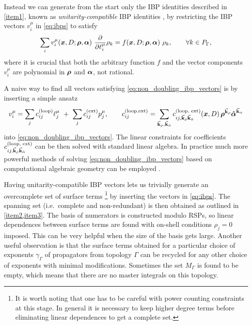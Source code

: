 Instead we can generate from the start only the IBP identities described in \cref{item1},
known as \emph{unitarity-compatible} IBP identities \cite{Gluza:2010ws,Schabinger:2011dz,Ita:2015tya}, by
restricting the IBP vectors $v_i^\mu$ in \cref{eq:ibps} to satisfy
\begin{equation} \label{eq:non_doubling_ibp_vectors}
  \sum_i v_i^\mu(\vb*{x},D;\vb*{\rho},\vb*{\alpha}) ~ \pdv{\ell^\mu_i} \rho_k = f(\vb*{x},D;\vb*{\rho},\vb*{\alpha}) ~ \rho_k, \qquad \forall k\in P_\Gamma,
\end{equation}
where it is crucial that both the arbitrary function $f$ and the vector components $v_i^\mu$ are polynomial in $\vb*{\rho}$ and $\vb*{\alpha}$, not rational.

{
  \def\coeff{c^{(\text{loop, ext})}_{ij,\va{k}_\rho \va{k}_{\hat{\alpha}}}}
  A naive way to find all vectors satisfying \cref{eq:non_doubling_ibp_vectors}
  is by inserting a simple ansatz
  \begin{equation} \label{eq:unitarity_compaible_ibp_ansatz}
    v_i^\mu = \sum_{j}^{}c^{(\text{loop})}_{ij}\ell^\mu_j ~+~  \sum_{j}^{}c^{(\text{ext})}_{ij} p^\mu_j, \qquad
    c_{ij}^{(\text{loop,ext})} = \sum_{\va{k}_\rho, \va{k}_{\hat{\alpha}}} \coeff (\vb*{x},D)\, \vb*{\rho}^{\va{k}_\rho}\vb*{\hat{\alpha}}^{\va{k}_\alpha}
  \end{equation}
  into \cref{eq:non_doubling_ibp_vectors}.
  The linear constraints for coefficients $\coeff$ can be then solved with standard linear algebra.
}%
In practice much more powerful methods of solving \cref{eq:non_doubling_ibp_vectors}  based on computational
algebraic geometry can be employed \cite{Larsen:2015ped,Boehm:2018fpv,Zhang:2016kfo,Abreu:2017xsl,Bendle2019}.

Having unitarity-compatible IBP vectors lets us trivially generate an overcomplete set of surface terms%
\footnote{
  It is worth noting that one has to be careful with power counting constraints at this stage.
  In general it is necessary to keep higher degree terms before eliminating linear dependences to get a complete set.
}
by inserting the vectors in \cref{eq:ibps}.
The spanning set (i.e.\ complete and non-redundant) is then obtained as outlined in \cref{item2,item3}.
The basis of numerators is constructed modulo RSPs, so
linear dependences between surface terms are found with on-shell conditions $\rho_j=0$ imposed.
This can be very helpful when the size of the basis gets large.
Another useful observation is that the surface terms obtained for a particular choice of exponents $\gamma_\Gamma$
of propagators from topology $\Gamma$ 
can be recycled for any other choice of exponents with minimal modifications.
Sometimes the set $M_\Gamma$ is found to be empty, which means that there are
no master integrals on this topology.


